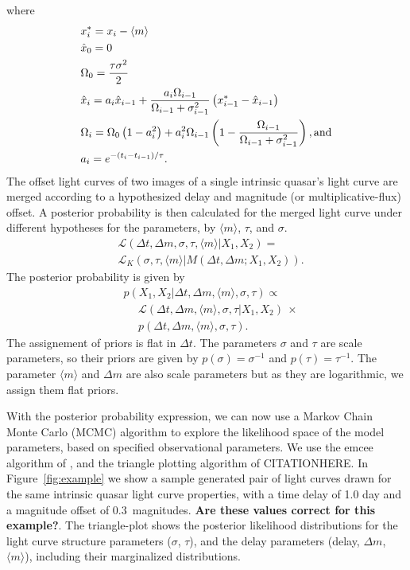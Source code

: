 \documentclass{emulateapj}
\begin{document}
where 
\begin{alignat}{1}
& x_{i}^{*} = x_i-\langle m \rangle \nonumber\\
& \hat{x}_0 = 0   \nonumber\\
& \Omega_{0}=\frac{\tau\sigma^2}{2} \nonumber\\
& \hat{x}_i = a_i\hat{x}_{i-1} + \frac{a_i\Omega_{i-1}}{\Omega_{i-1}+\sigma^2_{i-1}} \left(x^{*}_{i-1}-\hat{x}_{i-1}\right) \nonumber\\
& \Omega_{i}=\Omega_{0}\left(1-a_{i}^2\right) +
a_{i}^2\Omega_{i-1}\left(1-\frac{\Omega_{i-1}}{\Omega_{i-1}+\sigma_{i-1}^2}\right),
{\rm and} \nonumber\\
& a_i = e^{-\left(t_i-t_{i-1}\right)/\tau}. \nonumber
\end{alignat}
The offset light curves of two images of a single intrinsic quasar's 
light curve are merged according to a hypothesized delay and magnitude
(or multiplicative-flux) offset. A posterior probability is then
calculated for the merged light curve under different hypotheses for
the parameters, by $\langle m\rangle$, $\tau$, and $\sigma$.
\begin{align}
& \mathcal L (\Delta t, \Delta m, \sigma, \tau, \langle m \rangle | X_1, X_2)  = \nonumber \\
& \mathcal{L}_{K} \left( \sigma, \tau, \langle m \rangle  | M(\Delta
  t,\Delta m ; X_1, X_2) \right). 
\end{align}
The posterior probability is given by
\begin{align}
& p(X_1, X_2 | \Delta t, \Delta m, \langle m \rangle, \sigma,\tau) \propto \nonumber \\
&  \ \ \ \ \ \ \mathcal{L}(\Delta t, \Delta m, \langle m \rangle,
\sigma,\tau | X_1, X_2)\ \times\nonumber\\
&  \ \ \ \ \ \   p(\Delta t, \Delta m, \langle m \rangle,
\sigma,\tau). 
\end{align}
The assignement of priors is flat in $\Delta t$. The parameters
$\sigma$ and $\tau$ are scale parameters, so their priors are given by
$p(\sigma)=\sigma^{-1}$ and $p(\tau)=\tau^{-1}$. The parameter
$\langle m \rangle$ and $\Delta m$ are also scale parameters but as
they are logarithmic, we assign them flat priors.  

With the posterior probability expression, we can now use a Markov
Chain Monte Carlo (MCMC) algorithm to explore the likelihood space of
the model parameters, based on specified observational parameters. We
use the emcee algorithm of \citet{Foreman-Mackey2013a}, and the
triangle plotting algorithm of CITATIONHERE. In
Figure~\ref{fig:example} we show a sample generated pair of light
curves drawn for the same intrinsic quasar light curve properties,
with a time delay of 1.0 day and a magnitude offset of
0.3~magnitudes. {\bf Are these values correct for this example?}.  The
triangle-plot shows the posterior likelihood distributions for the
light curve structure parameters ($\sigma$, $\tau$), and the delay
parameters (delay, $\Delta m$, $\langle m\rangle$), including their
marginalized distributions. 
\end{document}
